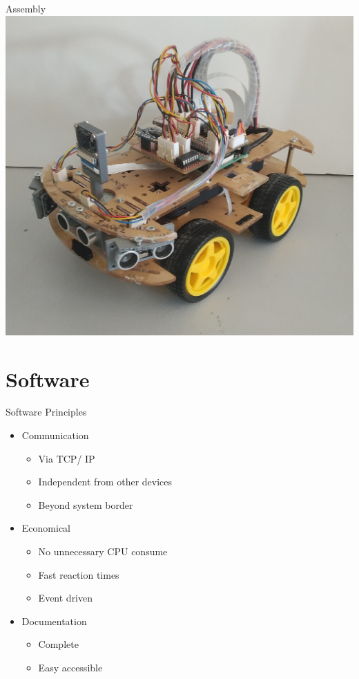 \documentclass{beamer}
\begin{document}
\begin{frame}{Assembly}
\centering
\includegraphics[scale=0.0835]{sources/car_complete.jpg}
\end{frame}

\section{Software}

\begin{frame}{Software Principles}
\begin{itemize}
\item Communication
	\begin{itemize}
	\item Via TCP/ IP
	\item Independent from other devices
	\item Beyond system border
	\end{itemize}
	\vspace{2mm}
	
\item<2-> Economical
	\begin{itemize}
	\item No unnecessary CPU consume
	\item Fast reaction times
	\item Event driven
	\end{itemize}
	\vspace{2mm}
	
\item<3-> Documentation
	\begin{itemize}
	\item Complete
	\item Easy accessible
	\end{itemize}
\end{itemize}
\end{frame}
\end{document}
